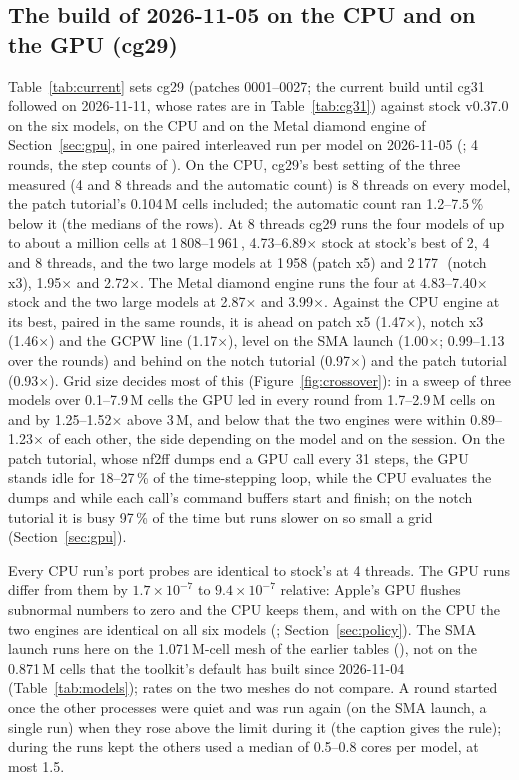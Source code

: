 \subsection{The build of 2026-11-05 on the CPU and on the GPU (cg29)}\label{sec:current}
Table~\ref{tab:current} sets cg29 (patches 0001--0027; the current build until cg31 followed on 2026-11-11, whose
rates are in Table~\ref{tab:cg31}) against stock v0.37.0 on the six models,
on the CPU and on the Metal diamond engine of Section~\ref{sec:gpu}, in one paired interleaved run per model on
2026-11-05 (; 4 rounds, the step counts of ). On the
CPU, cg29's best setting of the three measured (4 and 8 threads and the automatic count) is 8 threads on every
model, the patch tutorial's 0.104\,M cells included; the automatic count ran 1.2--7.5\,\% below it (the medians of
the rows). At 8 threads cg29 runs the four models of up to about a million cells at 1\,808--1\,961\,\MC,
4.73--6.89$\times$ stock at stock's best of 2, 4 and 8 threads, and the two large models at 1\,958 (patch x5) and
2\,177\,\MC\ (notch x3), 1.95$\times$ and 2.72$\times$. The Metal diamond engine runs the four at 4.83--7.40$\times$
stock and the two large models at 2.87$\times$ and 3.99$\times$. Against the CPU engine at its best, paired in the
same rounds, it is ahead on patch x5 (1.47$\times$), notch x3 (1.46$\times$) and the GCPW line (1.17$\times$), level
on the SMA launch (1.00$\times$; 0.99--1.13 over the rounds) and behind on the notch tutorial (0.97$\times$) and the
patch tutorial (0.93$\times$). Grid size decides most of this (Figure~\ref{fig:crossover}): in a sweep of three models
over 0.1--7.9\,M cells the GPU led in every round from 1.7--2.9\,M cells on and by 1.25--1.52$\times$ above 3\,M, and
below that the two engines were within 0.89--1.23$\times$ of each other, the side depending on the model and on the
session. On the patch tutorial, whose nf2ff dumps end a GPU call every 31 steps, the GPU stands idle for 18--27\,\% of the
time-stepping loop, while the CPU evaluates the dumps and while each call's command buffers start and finish; on the
notch tutorial it is busy 97\,\% of the time but runs slower on so small a grid
(Section~\ref{sec:gpu}).

Every CPU run's port probes are identical to stock's at 4 threads. The GPU runs differ from them by
$1.7\times10^{-7}$ to $9.4\times10^{-7}$ relative: Apple's GPU flushes subnormal numbers to zero and the CPU keeps
them, and with  on the CPU the two engines are identical on all six models
(; Section~\ref{sec:policy}). The SMA launch runs here on the 1.071\,M-cell mesh of the
earlier tables (), not on the 0.871\,M cells that the toolkit's default has built since
2026-11-04 (Table~\ref{tab:models}); rates on the two meshes do not compare. A round started once the other processes
were quiet and was run again (on the SMA launch, a single run) when they rose above the limit during it (the caption
gives the rule); during the runs kept the others used a median of 0.5--0.8 cores per model, at most 1.5.

